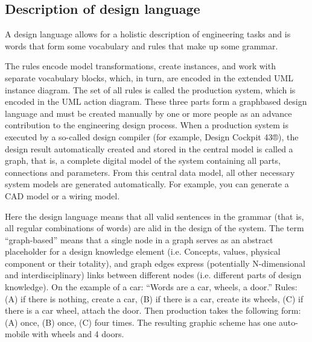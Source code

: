 \documentclass[8pt,twocolumn]{article}
\begin{document}
\subsection{Description of design language}
A design language allows for a holistic description of engineering tasks and is words that form some vocabulary and rules that make up some grammar.

The rules encode model transformations, create instances, and work with separate vocabulary blocks, which, in turn, are encoded in the extended UML instance diagram. The set of all rules is called the production system, which is encoded in the UML action diagram. These three parts form a graphbased design language and must be created manually by one or more people as an advance contribution to the engineering design process. When a production system is executed by a so-called design compiler (for example, Design Cockpit 43®), the design result automatically created and stored in the central model is called a graph, that is, a complete digital model of the system containing all parts, connections and parameters. From this central data model, all other necessary system models are generated automatically. For example, you can generate a CAD model or a wiring model.

Here the design language means that all valid sentences in the grammar (that is, all regular combinations of words) are alid in the design of the system. The term “graph-based” means that a single node in a graph serves as an abstract placeholder for a design knowledge element (i.e. Concepts, values, physical component or their totality), and graph edges express (potentially N-dimensional and interdisciplinary) links between different nodes (i.e. different parts of design knowledge). On the example of a car: “Words are a car, wheels, a door.” Rules: (A) if there is nothing, create a car, (B) if there is a car, create its wheels, (C) if there is a car wheel, attach the door. Then production takes the following form: (A) once, (B) once, (C) four times. The resulting graphic scheme has one auto-mobile with wheels and 4 doors.
\end{document}
